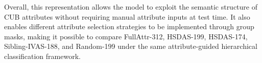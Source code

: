 Overall, this representation allows the model to exploit the semantic structure of CUB attributes without requiring manual attribute inputs at test time. It also enables different attribute selection strategies to be implemented through group masks, making it possible to compare FullAttr-312, HSDAS-199, HSDAS-174, Sibling-IVAS-188, and Random-199 under the same attribute-guided hierarchical classification framework.